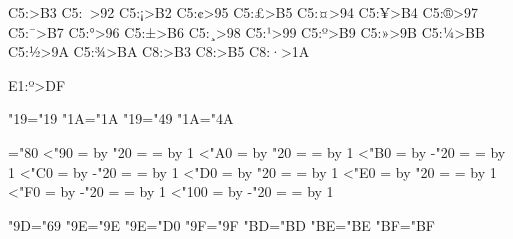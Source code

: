 \newutfenc C5:^^9f>B3%
\newutfenc C5:^^a0>92%
\newutfenc C5:^^a1>B2%
\newutfenc C5:^^a2>95%
\newutfenc C5:^^a3>B5%
\newutfenc C5:^^a4>94%
\newutfenc C5:^^a5>B4%
\newutfenc C5:^^ae>97%
\newutfenc C5:^^af>B7%
\newutfenc C5:^^b0>96%
\newutfenc C5:^^b1>B6%
\newutfenc C5:^^b8>98%
\newutfenc C5:^^b9>99%
\newutfenc C5:^^ba>B9%
\newutfenc C5:^^bb>9B%
\newutfenc C5:^^bc>BB%
\newutfenc C5:^^bd>9A%
\newutfenc C5:^^be>BA%
\newutfenc C8:^^99>B3%
\newutfenc C8:^^9b>B5%
\newutfenc C8:^^b7>1A%

\newutfenctwo E1:^^ba^^9e>DF%


\lccode"19="19 %
\lccode"1A="1A
\uccode"19="49
\uccode"1A="4A

\newcount\t@mp %
\newcount\l@ter
\def\ucr@w#1{%
  \loop\ifnum\t@mp<#1%
  \l@ter=\t@mp
  \advance\l@ter by "20%
  \lccode\t@mp=\l@ter
  \uccode\t@mp=\t@mp
  \advance\t@mp by 1%
\repeat}

\def\lcr@w#1{%
  \loop\ifnum\t@mp<#1%
  \l@ter=\t@mp
  \advance\l@ter by -"20%
  \uccode\t@mp=\l@ter
  \lccode\t@mp=\t@mp
  \advance\t@mp by 1%
\repeat}

\t@mp="80%
\ucr@w{"90}
\ucr@w{"A0}
\lcr@w{"B0}
\lcr@w{"C0}
\ucr@w{"D0}
\ucr@w{"E0}
\lcr@w{"F0}
\lcr@w{"100}

\lccode"9D="69 %
\lccode"9E="9E %
\uccode"9E="D0
\lccode"9F="9F %
\uccode"BD="BD
\uccode"BE="BE
\uccode"BF="BF

\unrootme
